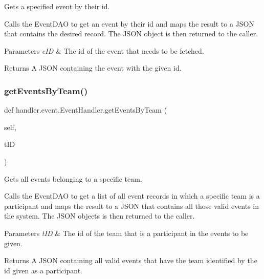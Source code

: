 Gets a specified event by their id. 

Calls the Event\+D\+AO to get an event by their id and maps the result to a J\+S\+ON that contains the desired record. The J\+S\+ON object is then returned to the caller.


\begin{DoxyParams}{Parameters}
{\em e\+ID} & The id of the event that needs to be fetched.\\
\hline
\end{DoxyParams}
\begin{DoxyReturn}{Returns}
A J\+S\+ON containing the event with the given id. 
\end{DoxyReturn}
\mbox{\label{classhandler_1_1event_1_1_event_handler_a0b5135c2269c49c58f165e428d7976fd}} 
\subsubsection{\texorpdfstring{get\+Events\+By\+Team()}{getEventsByTeam()}}
{\footnotesize\ttfamily def handler.\+event.\+Event\+Handler.\+get\+Events\+By\+Team (\begin{DoxyParamCaption}\item[{}]{self,  }\item[{}]{t\+ID }\end{DoxyParamCaption})}



Gets all events belonging to a specific team. 

Calls the Event\+D\+AO to get a list of all event records in which a specific team is a participant and maps the result to a J\+S\+ON that contains all those valid events in the system. The J\+S\+ON objects is then returned to the caller.


\begin{DoxyParams}{Parameters}
{\em t\+ID} & The id of the team that is a participant in the events to be given.\\
\hline
\end{DoxyParams}
\begin{DoxyReturn}{Returns}
A J\+S\+ON containing all valid events that have the team identified by the id given as a participant. 
\end{DoxyReturn}
\mbox{\label{classhandler_1_1event_1_1_event_handler_a511281731fc33fae52d80e432680692d}} 
